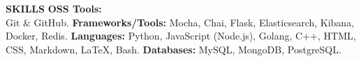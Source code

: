 \documentclass[a4paper, 12pt]{article}
\begin{document}
\section*{}
\begin{vwcol}[widths={0.2, 0.8}, justify=flush, sep=0.7cm, rule=0pt, indent=1em]
\large{\textbf{\textcolor{uclagold}{SKILLS}}}\newline\newline\newline\newline\newline\newline\newline\newline\newline
\large{\textbf{OSS Tools:\\} Git \& GitHub.}\vspace{0.1cm}\newline
\large{\textbf{Frameworks/Tools:} Mocha, Chai, Flask, Elasticsearch, Kibana, Docker, Redis.}\vspace{0.1cm}\newline
\large{\textbf{Languages:} Python, JavaScript (Node.js), Golang, C++, HTML, CSS, Markdown, LaTeX, Bash.}\vspace{0.1cm}\newline
\large{\textbf{Databases:} MySQL, MongoDB, PostgreSQL.}\vspace{0.1cm}
\end{vwcol}

\vspace{-2.2cm}
\end{document}
